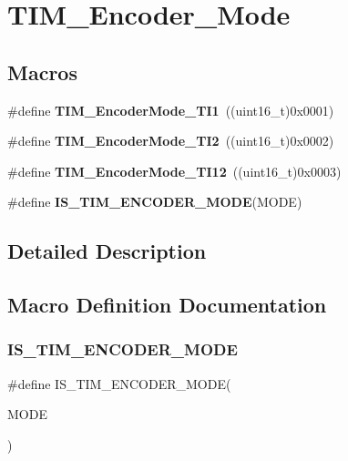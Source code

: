 \section{T\+I\+M\+\_\+\+Encoder\+\_\+\+Mode}
\label{group__TIM__Encoder__Mode}
\subsection*{Macros}
\begin{DoxyCompactItemize}
\item 
\#define \textbf{ T\+I\+M\+\_\+\+Encoder\+Mode\+\_\+\+T\+I1}~((uint16\+\_\+t)0x0001)
\item 
\#define \textbf{ T\+I\+M\+\_\+\+Encoder\+Mode\+\_\+\+T\+I2}~((uint16\+\_\+t)0x0002)
\item 
\#define \textbf{ T\+I\+M\+\_\+\+Encoder\+Mode\+\_\+\+T\+I12}~((uint16\+\_\+t)0x0003)
\item 
\#define \textbf{ I\+S\+\_\+\+T\+I\+M\+\_\+\+E\+N\+C\+O\+D\+E\+R\+\_\+\+M\+O\+DE}(M\+O\+DE)
\end{DoxyCompactItemize}


\subsection{Detailed Description}


\subsection{Macro Definition Documentation}
\mbox{\label{group__TIM__Encoder__Mode_ga9dd5baa6b2a44e0f25068a650cbfdd1b}} 
\subsubsection{I\+S\+\_\+\+T\+I\+M\+\_\+\+E\+N\+C\+O\+D\+E\+R\+\_\+\+M\+O\+DE}
{\footnotesize\ttfamily \#define I\+S\+\_\+\+T\+I\+M\+\_\+\+E\+N\+C\+O\+D\+E\+R\+\_\+\+M\+O\+DE(\begin{DoxyParamCaption}\item[{}]{M\+O\+DE }\end{DoxyParamCaption})}

